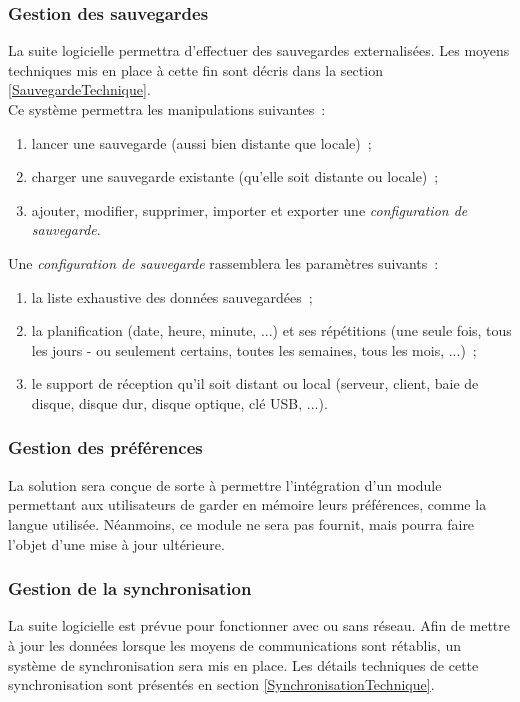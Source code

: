 \subsubsection{Gestion des sauvegardes}
La suite logicielle permettra d'effectuer des sauvegardes externalisées. Les moyens techniques mis en place à cette fin sont décris dans la section \ref{SauvegardeTechnique}.
\\
Ce système permettra les manipulations suivantes~:
\begin{enumerate}
	\item lancer une sauvegarde (aussi bien distante que locale)~;
	\item charger une sauvegarde existante (qu'elle soit distante ou locale)~;
	\item ajouter, modifier, supprimer, importer et exporter une \emph{configuration de sauvegarde}.
\end{enumerate}
Une \emph{configuration de sauvegarde} rassemblera les paramètres suivants~:
\begin{enumerate}
	\item la liste exhaustive des données sauvegardées~;
	\item la planification (date, heure, minute, ...) et ses répétitions (une seule fois, tous les jours - ou seulement certains, toutes les semaines, tous les mois, ...)~;
	\item le support de réception qu'il soit distant ou local (serveur, client, baie de disque, disque dur, disque optique, clé USB, ...).
\end{enumerate}

\subsubsection{Gestion des préférences}
La solution sera conçue de sorte à permettre l'intégration d'un module permettant aux utilisateurs de garder en mémoire leurs préférences, comme la langue utilisée. Néanmoins, ce module ne sera pas fournit, mais pourra faire l'objet d'une mise à jour ultérieure.

\subsubsection{Gestion de la synchronisation}
La suite logicielle est prévue pour fonctionner avec ou sans réseau. Afin de mettre à jour les données lorsque les moyens de communications sont rétablis, un système de synchronisation sera mis en place. Les détails techniques de cette synchronisation sont présentés en section \ref{SynchronisationTechnique}.

